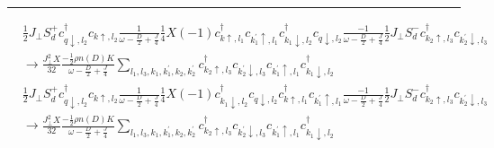 \documentclass[12pt]{revtex4-2}
\begin{document}
\hrule

\begin{equation}\begin{aligned}
	&\frac{1}{2}J_\perp S_d^+ c^\dagger_{q \downarrow, l_2}c_{k \uparrow, l_2} \frac{1}{\omega - \frac{D}{2} + \frac{J}{4}} \frac{1}{4}X \left( -1 \right) c^\dagger_{k\uparrow,l_1}c_{k_1^\prime\uparrow,l_1}c^\dagger_{k_1 \downarrow,l_2}c_{q \downarrow,l_2} \frac{-1}{\omega - \frac{D}{2} + \frac{J}{4}}\frac{1}{2}J_\perp S_d^- c^\dagger_{k_2 \uparrow, l_3}c_{k_2^\prime \downarrow, l_3} \\
	&\longrightarrow \frac{J_\perp^2 X}{32} \frac{-\frac{1}{2}\rho n(D) K}{\omega - \frac{D}{2} + \frac{J}{4}}\sum_{l_1, l_3, k_1, k_1^\prime,k_2,k_2^\prime} c^\dagger_{k_2 \uparrow, l_3}c_{k_2^\prime \downarrow, l_3}c_{k_1^\prime\uparrow,l_1}c^\dagger_{k_1 \downarrow,l_2}
\end{aligned}\end{equation}
\begin{equation}\begin{aligned}
	&\frac{1}{2}J_\perp S_d^+ c^\dagger_{q \downarrow, l_2}c_{k \uparrow, l_2} \frac{1}{\omega - \frac{D}{2} + \frac{J}{4}} \frac{1}{4}X \left( -1 \right) c^\dagger_{k_1 \downarrow,l_2}c_{q \downarrow,l_2} c^\dagger_{k\uparrow,l_1}c_{k_1^\prime\uparrow,l_1} \frac{-1}{\omega - \frac{D}{2} + \frac{J}{4}}\frac{1}{2}J_\perp S_d^- c^\dagger_{k_2 \uparrow, l_3}c_{k_2^\prime \downarrow, l_3} \\
	&\longrightarrow \frac{J_\perp^2 X}{32} \frac{-\frac{1}{2}\rho n(D) K}{\omega - \frac{D}{2} + \frac{J}{4}}\sum_{l_1, l_3, k_1, k_1^\prime,k_2,k_2^\prime} c^\dagger_{k_2 \uparrow, l_3}c_{k_2^\prime \downarrow, l_3}c_{k_1^\prime\uparrow,l_1}c^\dagger_{k_1 \downarrow,l_2}
\end{aligned}\end{equation}
\end{document}

